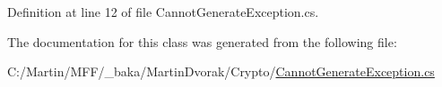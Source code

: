 Definition at line 12 of file Cannot\+Generate\+Exception.\+cs.



The documentation for this class was generated from the following file\+:\begin{DoxyCompactItemize}
\item 
C\+:/\+Martin/\+M\+F\+F/\+\_\+baka/\+Martin\+Dvorak/\+Crypto/\hyperlink{_cannot_generate_exception_8cs}{Cannot\+Generate\+Exception.\+cs}\end{DoxyCompactItemize}

